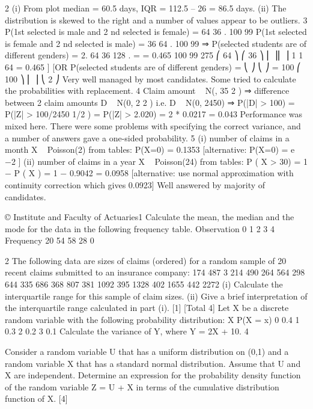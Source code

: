 \documentclass[a4paper,12pt]{article}
\begin{document}
2
(i) From plot median = 60.5 days, IQR = 112.5 – 26 = 86.5 days.
(ii) The distribution is skewed to the right and a number of values appear to be
outliers.
3
P(1st selected is male and 2 nd selected is female) = 64 36
.
100 99
P(1st selected is female and 2 nd selected is male) = 36 64
.
100 99
⇒ P(selected students are of different genders) = 2.
64 36 128
. =
= 0.465
100 99 275
⎛ 64 ⎞ ⎛ 36 ⎞
⎜ ⎟⎜ ⎟
1
1
64  
= 0.465 ]
[OR P(selected students are of different genders) = ⎝ ⎠ ⎝ ⎠ =
100 
⎛ 100 ⎞
⎜
⎟
⎝ 2 ⎠
Very well managed by most candidates. Some tried to calculate the probabilities with
replacement.
4
Claim amount ~ N(\mu, 35 2 ) ⇒ difference between 2 claim amounts D ~ N(0, 2 2 )
i.e. D ~ N(0, 2450)
⇒ P(|D| > 100) = P(|Z| > 100/2450 1/2 ) = P(|Z| > 2.020) = 2 * 0.0217 = 0.043
Performance was mixed here. There were some problems with specifying the correct
variance, and a number of answers gave a one-sided probability.
5
(i)
number of claims in a month X ~ Poisson(2)
from tables: P(X=0) = 0.1353
[alternative: P(X=0) = e −2 ]
(ii)
number of claims in a year X ~ Poisson(24)
from tables: P ( X > 30) = 1 − P ( X ) = 1 − 0.9042 = 0.0958
[alternative: use normal approximation with continuity correction which
gives 0.0923]
Well answered by majority of candidates.
\newpage


© Institute and Faculty of Actuaries1
Calculate the mean, the median and the mode for the data in the following frequency
table.
Observation 0 1 2 3 4
Frequency 20 54 58 28 0

2
The following data are sizes of claims (ordered) for a random sample of 20 recent
claims submitted to an insurance company:
174
487
3
214
490
264
564
298
644
335
686
368
807
381
1092
395
1328
402
1655
442
2272
(i) Calculate the interquartile range for this sample of claim sizes.
(ii) Give a brief interpretation of the interquartile range calculated in part (i). [1]
[Total 4]
Let X be a discrete random variable with the following probability distribution:
X
P(X = x)
0
0.4
1
0.3
2
0.2
3
0.1
Calculate the variance of Y, where Y = 2X + 10.
4


Consider a random variable U that has a uniform distribution on (0,1) and a random
variable X that has a standard normal distribution. Assume that U and X are
independent.
Determine an expression for the probability density function of the random variable Z
= U + X in terms of the cumulative distribution function of X.
[4]
\end{document}
